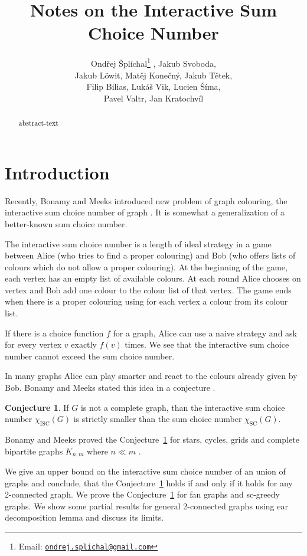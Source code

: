 \documentclass[11pt,a4paper]{article}
\title{Notes on the Interactive Sum Choice Number}
\author{
Ondřej Šplíchal\footnote{Email: \href{mailto:ondrej.splichal@gmail.com}{\texttt{ondrej.splichal@gmail.com}}} , 
Jakub Svoboda, \\
Jakub L\"owit,
Matěj Konečný, 
Jakub Tětek, \\
Filip Bilias, 
Lukáš Vik, 
Lucien Šíma, \\
Pavel Valtr, 
Jan Kratochvíl
}
\theoremstyle{plain}
\theoremstyle{definition}
\newtheorem{conj}{Conjecture}
\theoremstyle{remark}
\newcommand{\scn}{\chi_\text{SC}}
\newcommand{\iscn}{\chi_\text{ISC}}
\begin{document}
\maketitle

\begin{abstract}
   abstract-text
\end{abstract}


\section{Introduction}

Recently, Bonamy and Meeks introduced new problem of graph colouring, the interactive sum choice number of graph \cite{iscn}. It is somewhat a generalization of a better-known sum choice number. 

The interactive sum choice number is a length of ideal strategy in a game between Alice (who tries to find a proper colouring) and Bob (who offers lists of colours which do not allow a proper colouring). At the beginning of the game, each vertex has an empty list of available colours. At each round Alice chooses on vertex and Bob add one colour to the colour list of that vertex. The game ends when there is a proper colouring using for each vertex a colour from its colour list.

If there is a choice function $f$ for a graph, Alice can use a naive strategy and ask for every vertex $v$ exactly $f(v)$ times. We see that the interactive sum choice number cannot exceed the sum choice number.

In many graphs Alice can play smarter and react to the colours already given by Bob. Bonamy and Meeks stated this idea in a conjecture \cite{iscn}.

\begin{conj}\label{conjecture}
If $G$ is not a complete graph, than the interactive sum choice number $\iscn(G)$ is strictly smaller than the sum choice number $\scn(G)$.
\end{conj}

Bonamy and Meeks proved the Conjecture~\ref{conjecture} for stars, cycles, grids and complete bipartite graphs $K_{n,m}$ where $n\ll m $ \cite{iscn}.

We give an upper bound on the interactive sum choice number of an union of graphs and conclude, that the Conjecture~\ref{conjecture} holds if and only if it holds for any 2-connected graph. We prove the Conjecture~\ref{conjecture} for fan graphs and sc-greedy graphs. We show some partial results for general 2-connected graphs using ear decomposition lemma and discuss its limits.
\end{document}
